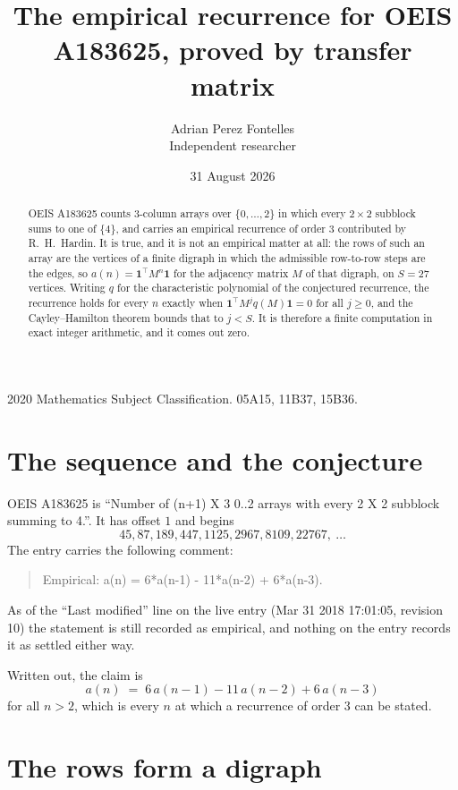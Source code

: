 \documentclass[11pt,a4paper]{article}
\title{The empirical recurrence for OEIS A183625, proved by transfer matrix}
\author{Adrian Perez Fontelles\\ \small Independent researcher}
\date{31 August 2026}
\theoremstyle{plain}
\theoremstyle{definition}
\begin{document}
\maketitle

\begin{abstract}
OEIS A183625 counts $3$-column arrays over $\{0,\dots,2\}$ in which every
$2\times2$ subblock sums to one of $\{4\}$, and carries an empirical
recurrence of order $3$ contributed by R.~H.~Hardin. It is true, and it is not an
empirical matter at all: the rows of such an array are the vertices of a finite digraph in
which the admissible row-to-row steps are the edges, so $a(n)=\mathbf{1}^{\!\top}M^{n}
\mathbf{1}$ for the adjacency matrix $M$ of that digraph, on $S=27$ vertices. Writing
$q$ for the characteristic polynomial of the conjectured recurrence, the recurrence holds
for every $n$ exactly when $\mathbf{1}^{\!\top}M^{j}q(M)\mathbf{1}=0$ for all
$j\ge0$, and the Cayley--Hamilton theorem bounds that to $j<S$. It is therefore a finite
computation in exact integer arithmetic, and it comes out zero.
\end{abstract}

\noindent\small 2020 Mathematics Subject Classification. 05A15, 11B37, 15B36.\normalsize

\section{The sequence and the conjecture}

OEIS A183625 is ``Number of (n+1) X 3 0..2 arrays with every 2 X 2 subblock summing to 4.''. It has offset $1$
and begins
\[
45, 87, 189, 447, 1125, 2967, 8109, 22767,\ \dots
\]
The entry carries the following comment:
\begin{quote}\small
Empirical: a(n) = 6*a(n-1) - 11*a(n-2) + 6*a(n-3).
\end{quote}
As of the ``Last modified'' line on the live entry (Mar 31 2018 17:01:05, revision 10) the statement is
still recorded as empirical, and nothing on the entry records it as settled either way.

Written out, the claim is
\begin{equation}\label{eq:conj}
a(n)\;=\;6\,a(n-1) - 11\,a(n-2) + 6\,a(n-3)
\end{equation}
for all $n>2$, which is every $n$ at which a recurrence of order $3$ can be
stated.

\section{The rows form a digraph}
\end{document}

